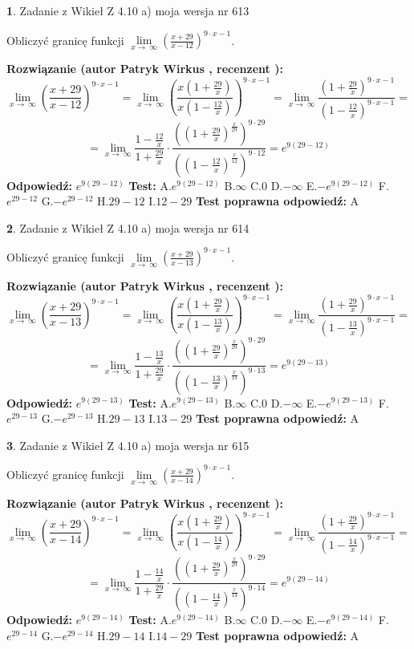 \documentclass[12pt, a4paper]{article}
\theoremstyle{definition} %
\newtheorem{zad}{}
\newcommand{\zadStart}[1]{\begin{zad}#1\newline}
\newcommand{\zadStop}{\end{zad}}
\newcommand{\rozwStart}[2]{\noindent \textbf{Rozwiązanie (autor #1 , recenzent #2): }\newline}
\newcommand{\rozwStop}{\newline}
\newcommand{\odpStart}{\noindent \textbf{Odpowiedź:}\newline}
\newcommand{\odpStop}{\newline}
\newcommand{\testStart}{\noindent \textbf{Test:}\newline}
\newcommand{\testStop}{\newline}
\newcommand{\kluczStart}{\noindent \textbf{Test poprawna odpowiedź:}\newline}
\newcommand{\kluczStop}{\newline}
\begin{document}
\zadStart{Zadanie z Wikieł Z 4.10 a) moja wersja nr 613}


Obliczyć granicę funkcji  $\lim\limits_{x\to\ \infty}(\frac{x+29}{x-12})^{9\cdot x-1}$.
\zadStop
\rozwStart{Patryk Wirkus}{}
$$\lim\limits_{x\to\ \infty}(\frac{x+29}{x-12})^{9\cdot x-1} = \lim\limits_{x\to\ \infty}(\frac{x(1+\frac{29}{x})}{x(1-\frac{12}{x})})^{9\cdot x-1}=\lim\limits_{x\to\ \infty}\frac{(1+\frac{29}{x})^{9\cdot x-1}}{(1-\frac{12}{x})^{9\cdot x-1}}=$$
$$=\lim\limits_{x\to\ \infty}\frac{1-\frac{12}{x}}{1+\frac{29}{x}}\cdot\frac{((1+\frac{29}{x})^{\frac{x}{29}})^{9\cdot29}}{((1-\frac{12}{x})^{\frac{x}{12}})^{9\cdot12}}=e^{9(29-12)}$$
\rozwStop
\odpStart
$e^{9(29-12)}$
\odpStop
\testStart
A.$e^{9(29-12)}$ B.$\infty$ C.$0$ D.$-\infty$ E.$-e^{9(29-12)}$
F.$e^{29-12}$ G.$-e^{29-12}$
H.$29-12$
I.$12-29$
\testStop
\kluczStart
A
\kluczStop



\zadStart{Zadanie z Wikieł Z 4.10 a) moja wersja nr 614}


Obliczyć granicę funkcji  $\lim\limits_{x\to\ \infty}(\frac{x+29}{x-13})^{9\cdot x-1}$.
\zadStop
\rozwStart{Patryk Wirkus}{}
$$\lim\limits_{x\to\ \infty}(\frac{x+29}{x-13})^{9\cdot x-1} = \lim\limits_{x\to\ \infty}(\frac{x(1+\frac{29}{x})}{x(1-\frac{13}{x})})^{9\cdot x-1}=\lim\limits_{x\to\ \infty}\frac{(1+\frac{29}{x})^{9\cdot x-1}}{(1-\frac{13}{x})^{9\cdot x-1}}=$$
$$=\lim\limits_{x\to\ \infty}\frac{1-\frac{13}{x}}{1+\frac{29}{x}}\cdot\frac{((1+\frac{29}{x})^{\frac{x}{29}})^{9\cdot29}}{((1-\frac{13}{x})^{\frac{x}{13}})^{9\cdot13}}=e^{9(29-13)}$$
\rozwStop
\odpStart
$e^{9(29-13)}$
\odpStop
\testStart
A.$e^{9(29-13)}$ B.$\infty$ C.$0$ D.$-\infty$ E.$-e^{9(29-13)}$
F.$e^{29-13}$ G.$-e^{29-13}$
H.$29-13$
I.$13-29$
\testStop
\kluczStart
A
\kluczStop



\zadStart{Zadanie z Wikieł Z 4.10 a) moja wersja nr 615}


Obliczyć granicę funkcji  $\lim\limits_{x\to\ \infty}(\frac{x+29}{x-14})^{9\cdot x-1}$.
\zadStop
\rozwStart{Patryk Wirkus}{}
$$\lim\limits_{x\to\ \infty}(\frac{x+29}{x-14})^{9\cdot x-1} = \lim\limits_{x\to\ \infty}(\frac{x(1+\frac{29}{x})}{x(1-\frac{14}{x})})^{9\cdot x-1}=\lim\limits_{x\to\ \infty}\frac{(1+\frac{29}{x})^{9\cdot x-1}}{(1-\frac{14}{x})^{9\cdot x-1}}=$$
$$=\lim\limits_{x\to\ \infty}\frac{1-\frac{14}{x}}{1+\frac{29}{x}}\cdot\frac{((1+\frac{29}{x})^{\frac{x}{29}})^{9\cdot29}}{((1-\frac{14}{x})^{\frac{x}{14}})^{9\cdot14}}=e^{9(29-14)}$$
\rozwStop
\odpStart
$e^{9(29-14)}$
\odpStop
\testStart
A.$e^{9(29-14)}$ B.$\infty$ C.$0$ D.$-\infty$ E.$-e^{9(29-14)}$
F.$e^{29-14}$ G.$-e^{29-14}$
H.$29-14$
I.$14-29$
\testStop
\kluczStart
A
\kluczStop
\end{document}
